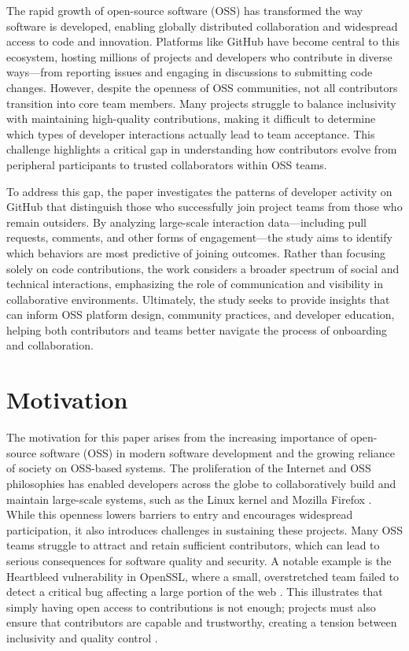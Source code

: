 The rapid growth of open-source software (OSS) has transformed the way software is developed, enabling globally distributed collaboration and widespread access to code and innovation. Platforms like GitHub have become central to this ecosystem, hosting millions of projects and developers who contribute in diverse ways—from reporting issues and engaging in discussions to submitting code changes. However, despite the openness of OSS communities, not all contributors transition into core team members. Many projects struggle to balance inclusivity with maintaining high-quality contributions, making it difficult to determine which types of developer interactions actually lead to team acceptance. This challenge highlights a critical gap in understanding how contributors evolve from peripheral participants to trusted collaborators within OSS teams.

To address this gap, the paper investigates the patterns of developer activity on GitHub that distinguish those who successfully join project teams from those who remain outsiders. By analyzing large-scale interaction data—including pull requests, comments, and other forms of engagement—the study aims to identify which behaviors are most predictive of joining outcomes. Rather than focusing solely on code contributions, the work considers a broader spectrum of social and technical interactions, emphasizing the role of communication and visibility in collaborative environments. Ultimately, the study seeks to provide insights that can inform OSS platform design, community practices, and developer education, helping both contributors and teams better navigate the process of onboarding and collaboration.

\section{Motivation}
The motivation for this paper arises from the increasing importance of open-source software (OSS) in modern software development and the growing reliance of society on OSS-based systems. The proliferation of the Internet and OSS philosophies has enabled developers across the globe to collaboratively build and maintain large-scale systems, such as the Linux kernel and Mozilla Firefox \cite{1_Nakakoji2003,2_OSDDefinition,3_Fitzgerald2006}. While this openness lowers barriers to entry and encourages widespread participation, it also introduces challenges in sustaining these projects. Many OSS teams struggle to attract and retain sufficient contributors, which can lead to serious consequences for software quality and security. A notable example is the Heartbleed vulnerability in OpenSSL, where a small, overstretched team failed to detect a critical bug affecting a large portion of the web \cite{4_Durumeric2014}. This illustrates that simply having open access to contributions is not enough; projects must also ensure that contributors are capable and trustworthy, creating a tension between inclusivity and quality control \cite{5_Bird2007}.

